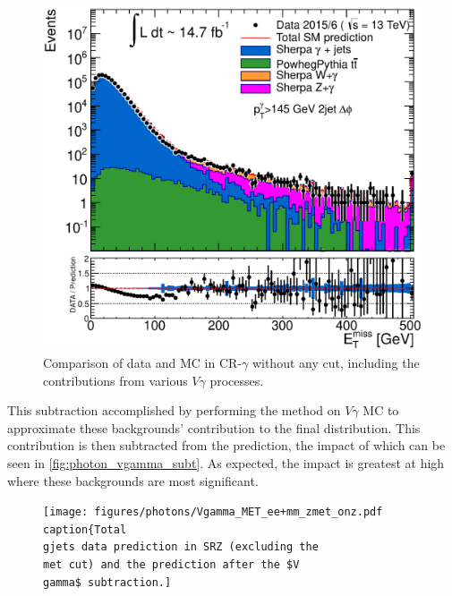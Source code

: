 \begin{centering}
\begin{figure}[!hbt]
\myfloatalign
\includegraphics[width=.90\linewidth]{figures/photons/hPhot_Met_dPhiJet_hist.eps}
\caption{Comparison of data and \ac{MC} in CR-$\gamma$ without any \HT cut, including the contributions from various $V\gamma$ processes.}
\label{fig:photon_vgamma}
\end{figure}
\end{centering}

This subtraction accomplished by performing the \gjets method on $V\gamma$ \ac{MC} to approximate these backgrounds' contribution to the final \met distribution. This contribution is then subtracted from the \gjets prediction, the impact of which can be seen in \autoref{fig:photon_vgamma_subt}. As expected, the impact is greatest at high \met where these backgrounds are most significant.

\begin{centering}
\begin{figure}[!hbt]
\myfloatalign
\texttt{[image: figures/photons/Vgamma\_MET\_ee+mm\_zmet\_onz.pdf
\\caption\{Total \\gjets data prediction in SRZ (excluding the \\met cut) and the prediction after the \$V\\gamma\$ subtraction.]}
\label{fig:photon_vgamma_subt}
\end{figure}
\end{centering}

